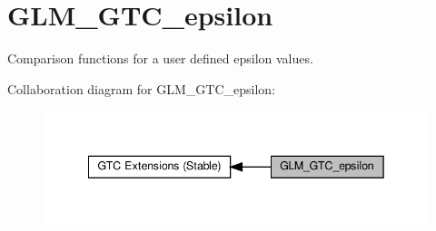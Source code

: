 \hypertarget{group__gtc__epsilon}{}\section{G\+L\+M\+\_\+\+G\+T\+C\+\_\+epsilon}
\label{group__gtc__epsilon}


Comparison functions for a user defined epsilon values.  


Collaboration diagram for G\+L\+M\+\_\+\+G\+T\+C\+\_\+epsilon\+:\nopagebreak
\begin{figure}[H]
\begin{center}
\leavevmode
\includegraphics[width=342pt]{group__gtc__epsilon}
\end{center}
\end{figure}
